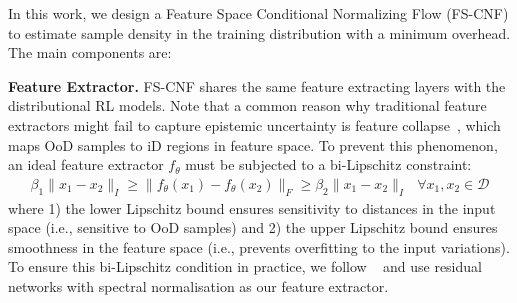 \documentclass{article}
\newcommand{\datapoint}{x}
\newcommand{\dataset}{\mathcal{D}}
\begin{document}
In this work, we design a Feature Space Conditional Normalizing Flow (FS-CNF) to estimate sample density in the training distribution with a minimum overhead. The main components are:

\noindent\textbf{Feature Extractor.} FS-CNF shares the same feature extracting layers with the distributional RL models. 
Note that a common reason why traditional feature extractors might fail to capture epistemic uncertainty is feature collapse~\cite{Amersfoort2020FeatureCollapse}, which maps OoD samples to iD regions in feature space. To prevent this phenomenon, an ideal feature extractor $f_{\theta}$ must be subjected to a bi-Lipschitz constraint:
\begin{align}
\beta_{1}\|\datapoint_{1}-\datapoint_{2}\|_{I}\geq\|f_{\theta}(\datapoint_{1})-f_{\theta}(\datapoint_{2})\|_{F}\geq\beta_{2}\|\datapoint_{1}-\datapoint_{2}\|_{I}\text{ }\forall{\datapoint_{1},\datapoint_{2}\in\dataset}
\end{align}
where 1) the lower Lipschitz bound ensures sensitivity to distances in the input space (i.e., sensitive to OoD samples) and 2) the upper Lipschitz bound ensures smoothness in the feature space (i.e., prevents overfitting to the input variations). To ensure this bi-Lipschitz condition in practice, we follow ~\cite{Amersfoort2020FeatureCollapse} and use residual networks with spectral normalisation as our feature extractor.
\end{document}
